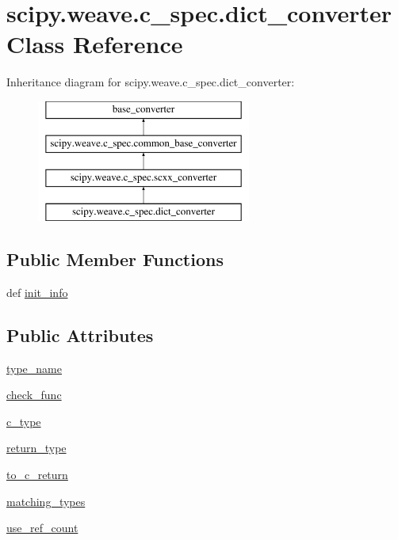 \hypertarget{classscipy_1_1weave_1_1c__spec_1_1dict__converter}{}\section{scipy.\+weave.\+c\+\_\+spec.\+dict\+\_\+converter Class Reference}
\label{classscipy_1_1weave_1_1c__spec_1_1dict__converter}
Inheritance diagram for scipy.\+weave.\+c\+\_\+spec.\+dict\+\_\+converter\+:\begin{figure}[H]
\begin{center}
\leavevmode
\includegraphics[height=4.000000cm]{classscipy_1_1weave_1_1c__spec_1_1dict__converter}
\end{center}
\end{figure}
\subsection*{Public Member Functions}
\begin{DoxyCompactItemize}
\item 
def \hyperlink{classscipy_1_1weave_1_1c__spec_1_1dict__converter_a668c2f8bdfb3da66bbdbd47ebcda19fa}{init\+\_\+info}
\end{DoxyCompactItemize}
\subsection*{Public Attributes}
\begin{DoxyCompactItemize}
\item 
\hyperlink{classscipy_1_1weave_1_1c__spec_1_1dict__converter_a7d6c6bc8caf30ea1847326d219c26a9c}{type\+\_\+name}
\item 
\hyperlink{classscipy_1_1weave_1_1c__spec_1_1dict__converter_a141211cf11a027415e27b949ffd172a3}{check\+\_\+func}
\item 
\hyperlink{classscipy_1_1weave_1_1c__spec_1_1dict__converter_aae1fa735c2143fad0deb824ba3a7fd81}{c\+\_\+type}
\item 
\hyperlink{classscipy_1_1weave_1_1c__spec_1_1dict__converter_adc485b6d074fd34d1a294333db90822a}{return\+\_\+type}
\item 
\hyperlink{classscipy_1_1weave_1_1c__spec_1_1dict__converter_af5e872dfe855d4655fbf785defbd17bc}{to\+\_\+c\+\_\+return}
\item 
\hyperlink{classscipy_1_1weave_1_1c__spec_1_1dict__converter_a310b80eea96a0b884ceba11b098c417c}{matching\+\_\+types}
\item 
\hyperlink{classscipy_1_1weave_1_1c__spec_1_1dict__converter_a6fba054788b0ab3c1ef88652b61320e7}{use\+\_\+ref\+\_\+count}
\end{DoxyCompactItemize}


